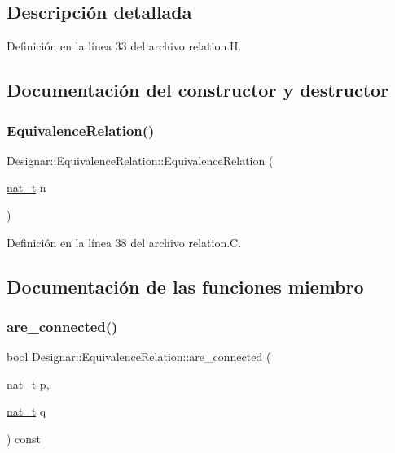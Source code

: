 \subsection{Descripción detallada}


Definición en la línea 33 del archivo relation.\+H.



\subsection{Documentación del constructor y destructor}
\mbox{\label{class_designar_1_1_equivalence_relation_a44544ffad6df87c47b30a6cd2a7254f2}} 
\subsubsection{\texorpdfstring{Equivalence\+Relation()}{EquivalenceRelation()}}
{\footnotesize\ttfamily Designar\+::\+Equivalence\+Relation\+::\+Equivalence\+Relation (\begin{DoxyParamCaption}\item[{\hyperlink{namespace_designar_aa72662848b9f4815e7bf31a7cf3e33d1}{nat\+\_\+t}}]{n }\end{DoxyParamCaption})}



Definición en la línea 38 del archivo relation.\+C.



\subsection{Documentación de las funciones miembro}
\mbox{\label{class_designar_1_1_equivalence_relation_a98972f1d96957b9fac030ca3001094e6}} 
\subsubsection{\texorpdfstring{are\+\_\+connected()}{are\_connected()}}
{\footnotesize\ttfamily bool Designar\+::\+Equivalence\+Relation\+::are\+\_\+connected (\begin{DoxyParamCaption}\item[{\hyperlink{namespace_designar_aa72662848b9f4815e7bf31a7cf3e33d1}{nat\+\_\+t}}]{p,  }\item[{\hyperlink{namespace_designar_aa72662848b9f4815e7bf31a7cf3e33d1}{nat\+\_\+t}}]{q }\end{DoxyParamCaption}) const}



